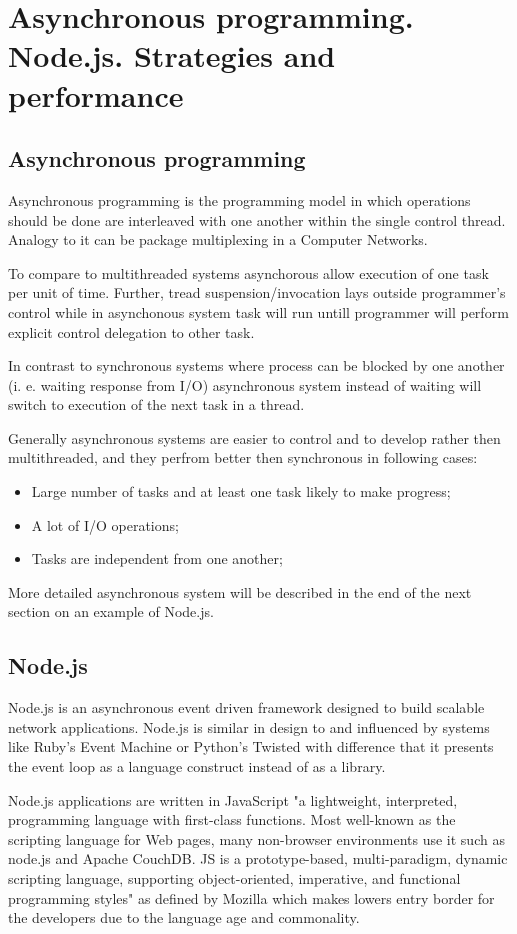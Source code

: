  \chapter{Asynchronous programming. Node.js. Strategies and performance}
\section{Asynchronous programming}
Asynchronous programming is the programming model in which operations should be done are interleaved with one another within the single control thread. Analogy to it can be package multiplexing in a Computer Networks. 

To compare to multithreaded systems asynchorous allow execution of one task per unit of time. Further, tread suspension/invocation lays outside programmer's control while in asynchonous system task will run untill programmer will perform explicit control delegation to other task.\cite{asyncArticle} 

In contrast to synchronous systems where process can be blocked by one another (i. e. waiting response from I/O) asynchronous system instead of waiting will switch to execution of the next task in a thread.

Generally asynchronous systems are easier to control and to develop rather then multithreaded, and  they perfrom better then synchronous in following cases\cite{asyncArticle}:
 \begin{itemize}
	\item Large number of tasks and at least one task likely to make progress;
	\item A lot of I/O operations;
	\item Tasks are independent from one another;
 \end{itemize}

More detailed asynchronous system will be described in the end of the next section on an example of Node.js.

\section{Node.js}
Node.js is an asynchronous event driven framework designed to build scalable network applications.
Node.js is similar in design to and influenced by systems like Ruby's Event Machine or Python's Twisted with difference that it presents the event loop as a language construct instead of as a library\cite{nodejsabout}.

Node.js applications are written in JavaScript "a lightweight, interpreted, programming language with first-class functions. Most well-known as the scripting language for Web pages, many non-browser environments use it such as node.js and Apache CouchDB. JS is a prototype-based, multi-paradigm, dynamic scripting language, supporting object-oriented, imperative, and functional programming styles" as defined by Mozilla\cite{mozillaJS} which makes lowers entry border for the developers due to the language age and commonality.
 
